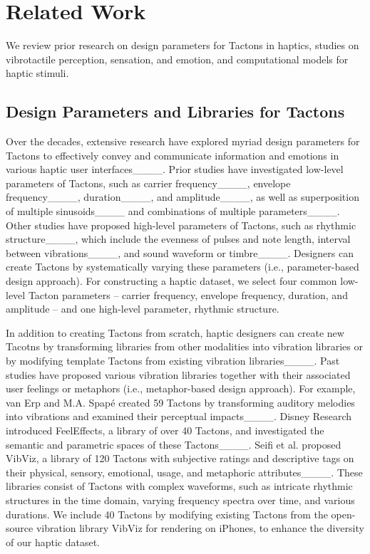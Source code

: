 \section{Related Work}
We review prior research on design parameters for Tactons in haptics, studies on vibrotactile perception, sensation, and emotion, and computational models for haptic stimuli.


\subsection{Design Parameters and Libraries for Tactons}
Over the decades, extensive research have explored myriad design parameters for Tactons to effectively convey and communicate information and emotions in various haptic user interfaces____.
Prior studies have investigated low-level parameters of Tactons, such as carrier frequency____, envelope frequency____, duration____, and amplitude____, as well as superposition of multiple sinusoids____ and combinations of multiple parameters____.
Other studies have proposed high-level parameters of Tactons, such as rhythmic structure____, which include the evenness of pulses and note length, interval between vibrations____, and sound waveform or timbre____.
Designers can create Tactons by systematically varying these parameters (i.e., parameter-based design approach).
For constructing a haptic dataset, we select four common low-level Tacton parameters -- carrier frequency, envelope frequency, duration, and amplitude -- and one high-level parameter, rhythmic structure.


In addition to creating Tactons from scratch, haptic designers can create new Tacotns by transforming libraries from other modalities into vibration libraries or by modifying template Tactons from existing vibration libraries____.
Past studies have proposed various vibration libraries together with their associated user feelings or metaphors (i.e., metaphor-based design approach).
For example, van Erp and M.A. Spap\'e created 59 Tactons by transforming auditory melodies into vibrations and examined their perceptual impacts____.
Disney Research introduced FeelEffects, a library of over 40 Tactons, and investigated the semantic and parametric spaces of these Tactons____.
Seifi et al. proposed VibViz, a library of 120 Tactons with subjective ratings and descriptive tags on their physical, sensory, emotional, usage, and metaphoric attributes____.
These libraries consist of Tactons with complex waveforms, such as intricate rhythmic structures in the time domain, varying frequency spectra over time, and various durations.
We include 40 Tactons by modifying existing Tactons from the open-source vibration library VibViz for rendering on iPhones, to enhance the diversity of our haptic dataset.


